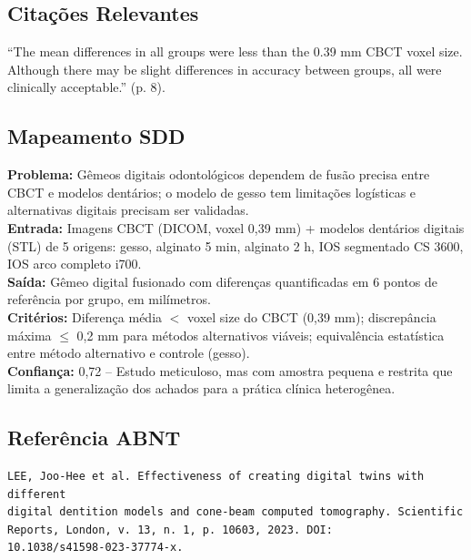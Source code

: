 \subsection{Citações Relevantes}
\begin{citacao}
``The mean differences in all groups were less than the 0.39 mm CBCT voxel
size. Although there may be slight differences in accuracy between groups,
all were clinically acceptable.'' (p. 8).
\end{citacao}

\subsection{Mapeamento SDD}
\textbf{Problema:} Gêmeos digitais odontológicos dependem de fusão precisa entre
CBCT e modelos dentários; o modelo de gesso tem limitações logísticas e
alternativas digitais precisam ser validadas. \\
\textbf{Entrada:} Imagens CBCT (DICOM, voxel 0,39 mm) + modelos dentários
digitais (STL) de 5 origens: gesso, alginato 5 min, alginato 2 h, IOS
segmentado CS 3600, IOS arco completo i700. \\
\textbf{Saída:} Gêmeo digital fusionado com diferenças quantificadas em 6
pontos de referência por grupo, em milímetros. \\
\textbf{Critérios:} Diferença média $<$ voxel size do CBCT (0,39 mm);
discrepância máxima $\leq$ 0,2 mm para métodos alternativos viáveis;
equivalência estatística entre método alternativo e controle (gesso). \\
\textbf{Confiança:} 0,72 -- Estudo meticuloso, mas com amostra pequena e
restrita que limita a generalização dos achados para a prática clínica
heterogênea.

\subsection{Referência ABNT}
\begin{verbatim}
LEE, Joo-Hee et al. Effectiveness of creating digital twins with different
digital dentition models and cone-beam computed tomography. Scientific
Reports, London, v. 13, n. 1, p. 10603, 2023. DOI:
10.1038/s41598-023-37774-x.
\end{verbatim}
